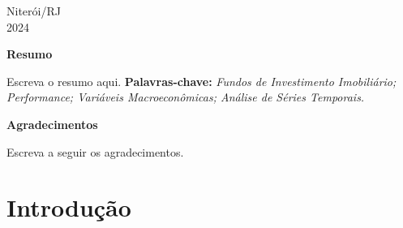 \documentclass[
  12pt,
]{article}
\renewcommand*\contentsname{Table of contents}
\newcommand\contentsname{Table of contents}
\begin{document}
    \begin{center}
        Niterói/RJ\\[0.2cm]
        2024 
    \end{center}
    
    \newpage
    
    \begin{center}
        \textbf{\Large Resumo}\\[0.2cm]
    \end{center}
    
    
    
    \begin{flushleft}
        \setlength{\parskip}{1cm} %
        \linespread{1.5}\selectfont %
        \hspace*{0cm}\parbox{16.5cm}{
            Escreva o resumo aqui.
            \linespread{1.5}\selectfont
            \textbf{Palavras-chave:} \textit{Fundos de Investimento Imobiliário; Performance; Variáveis Macroeconômicas; Análise de Séries Temporais.}
        }
    \end{flushleft}
    \newpage
    
    
    
    \begin{center}
        \textbf{\Large Agradecimentos}\\[0.2cm]
    \end{center}
    
    \begin{flushleft}
        \setlength{\parskip}{1cm} %
        \linespread{1.5}\selectfont %
        \hspace*{0cm}\parbox{16.5cm}{
            Escreva a seguir os agradecimentos.
        }
    
    
    \end{flushleft}
    \newpage
    
    
    
    
    
    \thispagestyle{empty}
    
        
    
\renewcommand*\contentsname{SUMÁRIO}
{
\hypersetup{linkcolor=}
\setcounter{tocdepth}{3}
\tableofcontents
}
\listoffigures
\listoftables

\newpage
\listofequations
\newpage

\section{Introdução}\label{introduuxe7uxe3o}
\end{document}
